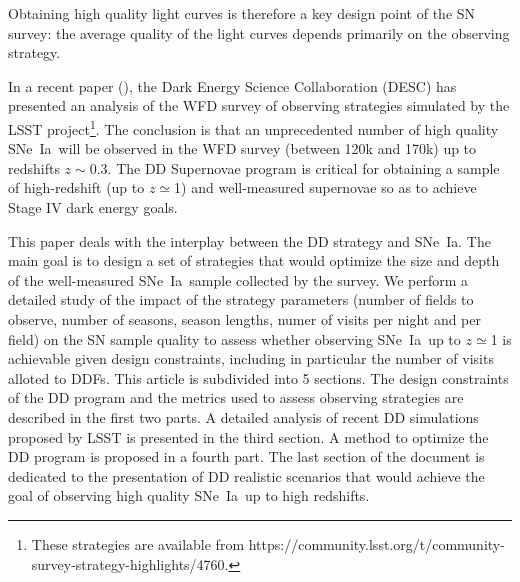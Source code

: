 \documentclass[skiphelvet,twocolumn]{aastex63}
\newcommand{\sne}{{SNe~Ia}}
\begin{document}
Obtaining high quality light curves is therefore a key design point of the SN survey:  the average quality of the light curves depends primarily on the observing strategy.
\par
In a recent paper (\cite{lochner2021impact}), the Dark Energy Science Collaboration (DESC) has presented an analysis of the WFD survey of observing strategies simulated by the LSST project\footnote{These strategies are available from https://community.lsst.org/t/community-survey-strategy-highlights/4760.}. The conclusion is that an unprecedented number of high quality \sne~will be observed in the WFD survey (between 120k and 170k) up to redshifts $z\sim 0.3$. The DD Supernovae program is critical for obtaining a sample of high-redshift (up to $z\simeq$1) and well-measured supernovae so as to achieve Stage IV dark energy goals.

\par
This paper deals with the interplay between the DD strategy and \sne. The main goal is to design a set of strategies that would optimize the size and depth of the well-measured \sne~sample collected by the survey. We perform a detailed study of the impact of the strategy parameters (number of fields to observe, number of seasons, season lengths, numer of visits per night and per field) on the SN sample quality to assess whether observing \sne~up to $z\simeq$1 is achievable given design constraints, including in particular the number of visits alloted to DDFs. This article is subdivided into 5 sections. The design constraints of the DD program and the metrics used to assess observing strategies are described in the first two parts. A detailed analysis of recent DD simulations proposed by LSST is presented in the third section. A method to optimize the DD program is proposed in a fourth part. The last section of the document is dedicated to the presentation of  DD realistic scenarios that would achieve the goal of observing high quality \sne~up to high redshifts.
\end{document}
